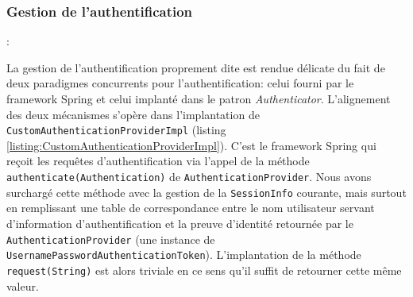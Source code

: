 \subsubsection{Gestion de l'authentification} : 

La gestion de l'authentification proprement dite est rendue délicate du fait de deux paradigmes concurrents pour l'authentification: celui fourni par le framework Spring et celui implanté dans le patron \textit{Authenticator}. L'alignement des deux mécanismes s'opère dans l'implantation de \texttt{CustomAuthenticationProviderImpl} (listing \ref{listing:CustomAuthenticationProviderImpl}). C'est le framework Spring qui reçoit les requêtes d'authentification via l'appel de la méthode \texttt{authenticate(Authentication)} de \texttt{AuthenticationProvider}. Nous avons surchargé cette méthode avec la gestion de la \texttt{SessionInfo} courante, mais surtout en remplissant une table de correspondance entre le nom utilisateur servant d'information d'authentification et la preuve d'identité retournée par le \texttt{AuthenticationProvider} (une instance de \texttt{UsernamePasswordAuthenticationToken}). L'implantation de la méthode \texttt{request(String)} est alors triviale en ce sens qu'il suffit de retourner cette même valeur.

